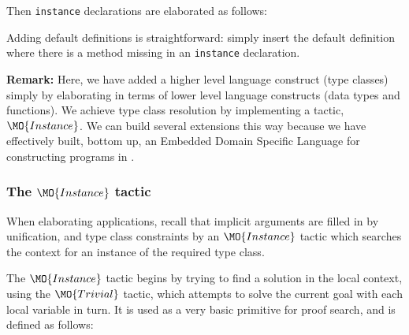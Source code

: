 \noindent
Then \texttt{instance} declarations are elaborated as follows:


Adding default definitions is straightforward: simply insert the default definition where
there is a method missing in an \texttt{instance} declaration.

\textbf{Remark:} Here, we have added a higher level language construct (type
classes) simply by elaborating in terms of lower level language constructs
(data types and functions).  We achieve type class resolution by implementing a
tactic, $\MO{Instance}$.  We can build several extensions this way because we
have effectively built, bottom up, an Embedded Domain Specific Language for
constructing programs in \TT{}.

\subsubsection{The $\MO{Instance}$ tactic}

\label{sect:instance}

When elaborating applications, recall that implicit arguments are filled in by
unification, and type class constraints by an $\MO{Instance}$ tactic which searches
the context for an instance of the required type class. 

The $\MO{Instance}$ tactic begins by trying to find a solution in the local context,
using the $\MO{Trivial}$ tactic, which attempts
to solve the current goal with each local variable in turn. It is used as a very
basic primitive for proof search, and is defined as follows:



